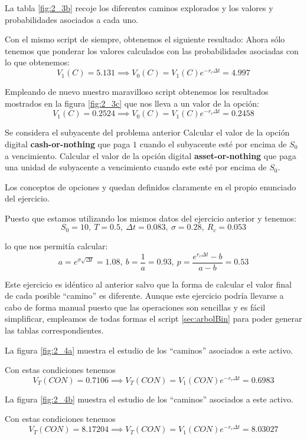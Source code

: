 \begin{problem}[3]
La tabla \ref{fig:2_3b} recoje los diferentes caminos explorados y los valores y probabilidades asociados a cada uno.

Con el mismo script de siempre, obtenemos el siguiente resultado:
Ahora sólo tenemos que ponderar los valores calculados con las probabilidades asociadas con lo que obtenemos:
\[V_1(C) = 5.131 \implies V_0(C) = V_1(C)e^{-r_cΔt} = 4.997\]

\spart

Empleando de nuevo nuestro maravilloso script obtenemos los resultados mostrados en la figura \ref{fig:2_3c} que nos lleva a un valor de la opción:
\[V_1(C) = 0.2524 \implies V_0(C) = V_1(C)e^{-r_cΔt} = 0.2458\]
\end{problem}


\begin{problem}[4]
Se considera el subyacente del problema anterior
\ppart Calcular el valor de la opción digital \textbf{cash-or-nothing} que paga $1$ cuando el subyacente esté por encima de $S_0$ a vencimiento.
\ppart Calcular el valor de la opción digital \textbf{asset-or-nothing} que paga una unidad de subyacente a vencimiento cuando este esté por encima de $S_0$.
\solution


Los conceptos de opciones  y  quedan definidos claramente en el propio enunciado del ejercicio.

Puesto que estamos utilizando los mismos datos del ejercicio anterior y tenemos:
\[S_0=10, \ T=0.5, \ Δt = 0.083, \ σ=0.28, \ R_c=0.053\]

lo que nos permitía calcular:
\[a=e^{σ\sqrt{Δt}} = 1.08, \ b = \frac{1}{a} = 0.93, \ p = \frac{e^{r_cΔt}-b}{a-b}=0.53\]

Este ejercicio es idéntico al anterior salvo que la forma de calcular el valor final de cada posible ``camino'' es diferente. Aunque este ejercicio podría llevarse a cabo de forma manual puesto que las operaciones son sencillas y es fácil simplificar, empleamos de todas formas el script \ref{sec:arbolBin} para poder generar las tablas correspondientes.

\spart

La figura \ref{fig:2_4a} muestra el estudio de los ``caminos'' asociados a este activo.


Con estas condiciones tenemos
\[V_T(CON) = 0.7106 \implies V_T(CON) = V_1(CON)e^{-r_cΔt} = 0.6983\]

\spart

La figura \ref{fig:2_4b} muestra el estudio de los ``caminos'' asociados a este activo.

Con estas condiciones tenemos
\[V_T(CON) = 8.17204 \implies V_T(CON) = V_1(CON)e^{-r_cΔt} = 8.03027\]

\end{problem}

